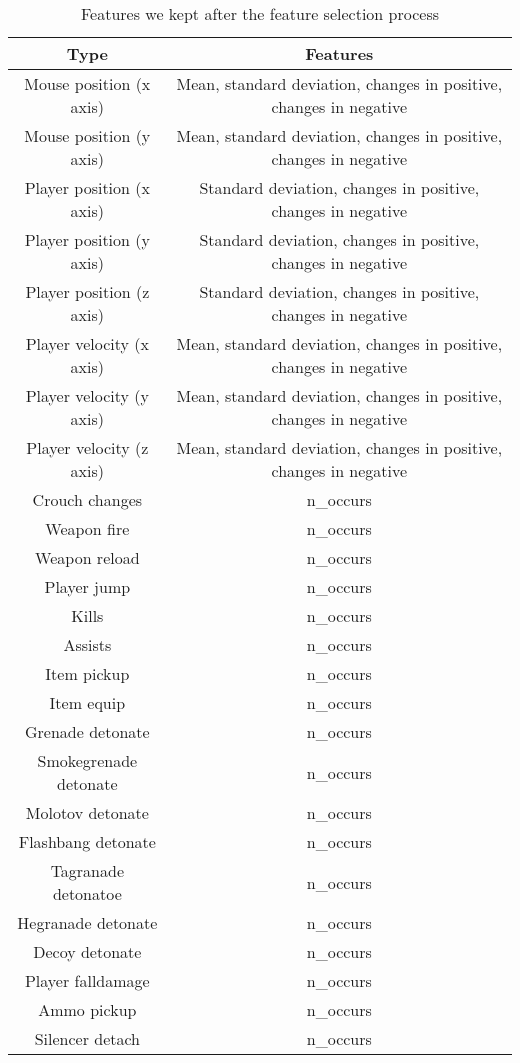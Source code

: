 		\begin{longtable}{|c|c|}

			\caption{\label{tab:features}Features we kept after the feature selection process}

			\hline
			\textbf{Type} & \textbf{Features} \\
			\hline
			Mouse position (x axis) & Mean, standard deviation, changes in positive, changes in negative\\
			\hline
			Mouse position (y axis) & Mean, standard deviation, changes in positive, changes in negative\\
			\hline
			Player position (x axis) & Standard deviation, changes in positive, changes in negative\\
			\hline
			Player position (y axis) & Standard deviation, changes in positive, changes in negative\\
			\hline
			Player position (z axis) & Standard deviation, changes in positive, changes in negative\\
			\hline
			Player velocity (x axis) & Mean, standard deviation, changes in positive, changes in negative\\
			\hline
			Player velocity (y axis) & Mean, standard deviation, changes in positive, changes in negative\\
			\hline
			Player velocity (z axis) & Mean, standard deviation, changes in positive, changes in negative\\
			\hline
			Crouch changes & n\_occurs\\
			\hline
			Weapon fire & n\_occurs \\
			\hline
			Weapon reload & n\_occurs \\
			\hline
			Player jump & n\_occurs \\
			\hline
			Kills & n\_occurs \\
			\hline
			Assists & n\_occurs \\
			\hline
			Item pickup & n\_occurs \\
			\hline
			Item equip & n\_occurs \\
			\hline
			Grenade detonate  & n\_occurs \\
			\hline
			Smokegrenade detonate & n\_occurs \\
			\hline
			Molotov detonate & n\_occurs \\
			\hline
			Flashbang detonate & n\_occurs \\
			\hline
			Tagranade detonatoe & n\_occurs \\
			\hline
			Hegranade detonate & n\_occurs \\
			\hline
			Decoy detonate & n\_occurs \\
			\hline
			Player falldamage & n\_occurs \\
			\hline
			Ammo pickup & n\_occurs \\
			\hline
			Silencer detach & n\_occurs \\
			\hline
		\end{longtable}
	
